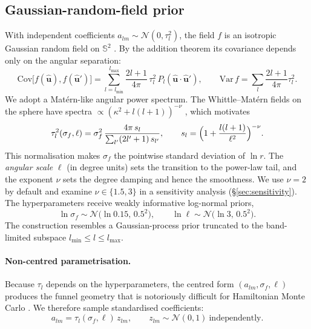\documentclass[11pt,a4paper]{article}
\theoremstyle{remark}
\newcommand{\uv}[1]{\hat{\bm{#1}}}
\newcommand{\Sph}{\mathbb{S}^2}
\begin{document}
\subsection{Gaussian-random-field prior}
\label{sec:grf}
With independent coefficients $a_{lm}\sim\mathcal N(0,\tau_l^2)$, the field $f$ is an isotropic Gaussian
random field on $\Sph$ \citep{marinucci2011}. By the addition theorem its covariance depends only on
the angular separation:
\begin{equation}
  \mathrm{Cov}\bigl[f(\uv u),f(\uv u')\bigr]=\sum_{l=l_{\min}}^{l_{\max}}\frac{2l+1}{4\pi}\,\tau_l^2\,P_l(\uv u\cdot\uv u'),
  \qquad
  \mathrm{Var}\,f=\sum_{l}\frac{2l+1}{4\pi}\tau_l^2 .
  \label{eq:cov}
\end{equation}
We adopt a Mat\'ern-like angular power spectrum. The Whittle--Mat\'ern fields on the sphere have
spectra $\propto(\kappa^2+l(l+1))^{-\nu}$ \citep{lang2015}, which motivates
\begin{equation}
  \tau_l^2(\sigma_f,\ell)=\sigma_f^2\,\frac{4\pi\,s_l}{\sum_{l'}(2l'+1)\,s_{l'}},\qquad
  s_l=\Bigl(1+\frac{l(l+1)}{\ell^2}\Bigr)^{-\nu}.
  \label{eq:spectrum}
\end{equation}
This normalisation makes $\sigma_f$ the pointwise standard deviation of $\ln r$. The \emph{angular scale}
$\ell$ (in degree units) sets the transition to the power-law tail, and the exponent $\nu$ sets the
degree damping and hence the smoothness. We use $\nu=2$ by default and examine $\nu\in\{1.5,3\}$ in a
sensitivity analysis (\S\ref{sec:sensitivity}). The hyperparameters receive weakly informative
log-normal priors,
\begin{equation}
  \ln\sigma_f\sim\mathcal N\bigl(\ln0.15,\,0.5^2\bigr),\qquad \ln\ell\sim\mathcal N\bigl(\ln3,\,0.5^2\bigr).
\end{equation}
The construction resembles a Gaussian-process prior \citep{rasmussen2006} truncated to the band-limited
subspace $l_{\min}\le l\le l_{\max}$.

\paragraph{Non-centred parametrisation.} Because $\tau_l$ depends on the hyperparameters, the centred
form $(a_{lm},\sigma_f,\ell)$ produces the funnel geometry that is notoriously difficult for
Hamiltonian Monte Carlo
\citep{papaspiliopoulos2007,betancourt2015}. We therefore sample standardised coefficients:
\begin{equation}
  a_{lm}=\tau_l(\sigma_f,\ell)\,z_{lm},\qquad z_{lm}\sim\mathcal N(0,1)\ \text{independently}.
  \label{eq:noncentred}
\end{equation}
\end{document}
